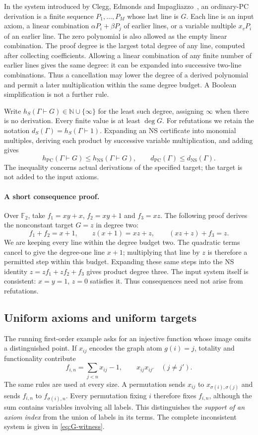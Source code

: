 \documentclass[11pt,a4paper]{article}
\theoremstyle{definition}\newtheorem{definition}[theorem]{Definition}
\theoremstyle{remark}\newtheorem{remark}[theorem]{Remark}
\newcommand{\NS}{\mathrm{NS}}\newcommand{\PC}{\mathrm{PC}}
\newcommand{\NN}{\mathbb N}\newcommand{\N}{\mathbb N}\newcommand{\Z}{\mathbb Z}\newcommand{\Q}{\mathbb Q}\newcommand{\Fp}{\mathbb F_p}
\begin{document}
In the system introduced by Clegg, Edmonds and
Impagliazzo~\cite{PCFoundations}, an ordinary-PC derivation is a finite
sequence $P_1,\ldots,P_M$ whose
last line is $G$. Each line is an input axiom, a linear combination
$\alpha P_i+\beta P_j$ of earlier lines, or a variable multiple $x_vP_i$
of an earlier line. The zero polynomial is also allowed as the empty
linear combination. The proof degree is the largest total degree of any
line, computed after collecting coefficients. Allowing a linear
combination of any finite number of earlier lines gives the same
degree: it can be expanded into successive two-line combinations. Thus a cancellation may
lower the degree of a derived polynomial and permit a later
multiplication within the same degree budget. A Boolean simplification
is not a further rule.

Write $h_S(\Gamma\vdash G)\in\NN\cup\{\infty\}$ for the least such
degree, assigning $\infty$ when there is no derivation. Every finite
value is at least $\deg G$. For refutations we retain the notation
$d_S(\Gamma)=h_S(\Gamma\vdash1)$. Expanding an NS certificate into
monomial multiples, deriving each product by successive variable
multiplication, and adding gives
\begin{equation}\label{eq:pcns}
 h_{\PC}(\Gamma\vdash G)\le h_{\NS}(\Gamma\vdash G),
 \qquad d_{\PC}(\Gamma)\le d_{\NS}(\Gamma).
\end{equation}
The inequality concerns actual derivations of the specified target;
the target is not added to the input axioms.

\paragraph{A short consequence proof.}
Over $\mathbb F_2$, take $f_1=xy+x$, $f_2=xy+1$ and $f_3=xz$.
The following proof derives the nonconstant target $G=z$ in degree two:
\[
 f_1+f_2=x+1,\qquad z(x+1)=xz+z,\qquad (xz+z)+f_3=z.
\]
We are keeping every line within the degree budget two. The quadratic
terms cancel to give the degree-one line $x+1$; multiplying that line
by $z$ is therefore a permitted step within this budget. Expanding
these same steps into the NS identity $z=zf_1+zf_2+f_3$ gives product
degree three. The input system itself is consistent: $x=y=1$, $z=0$
satisfies it. Thus consequences need not arise from refutations.

\subsection{Uniform axioms and uniform targets}
The running first-order example asks for an injective function whose
image omits a distinguished point. If $x_{ij}$ encodes the graph atom
$g(i)=j$, totality and functionality contribute
\[
                 f_{i,n}=\sum_{j<n}x_{ij}-1,
                 \qquad x_{ij}x_{ij'}\quad(j\ne j').
\]
The same rules are used at every size. A permutation sends $x_{ij}$ to
$x_{\sigma(i),\sigma(j)}$ and sends $f_{i,n}$ to $f_{\sigma(i),n}$.
Every permutation fixing $i$ therefore fixes $f_{i,n}$, although the
sum contains variables involving all labels. This distinguishes the
\emph{support of an axiom index} from the union of labels in its terms.
The complete inconsistent system is given in \eqref{eq:G-witness}.
\end{document}

